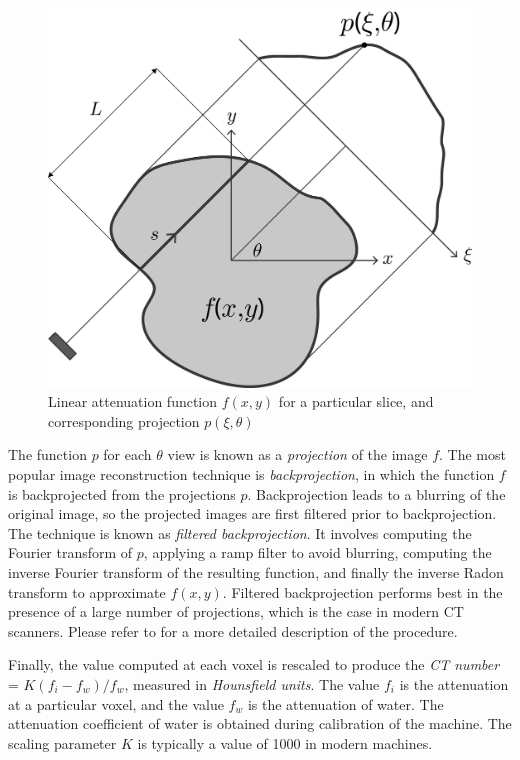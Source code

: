 \begin{figure}[ht]
\centering
		\includegraphics[scale=0.3]{media/0-imaging/ct3.png}
%
\caption{Linear attenuation function $f(x,y)$ for a particular slice, and corresponding projection $p(\xi,\theta)$}
\label{fig:ct3}
\end{figure}

The function $p$ for each $\theta$ view is known as a \textit{projection} of the image $f$. The most popular image reconstruction technique is \textit{backprojection}, in which the function $f$ is backprojected from the projections $p$. Backprojection leads to a blurring of the original image, so the projected images are first filtered prior to backprojection. The technique is known as \textit{filtered backprojection}. It involves computing the Fourier transform of $p$, applying a ramp filter to avoid blurring, computing the inverse Fourier transform of the resulting function, and finally the inverse Radon transform to approximate $f(x,y)$. Filtered backprojection performs best in the presence of a large number of projections, which is the case in modern CT scanners. Please refer to \cite{chetih_2015} for a more detailed description of the procedure.

Finally, the value computed at each voxel is rescaled to produce the \textit{CT number} = $K (f_i - f_w)/f_w$, measured in \textit{Hounsfield units}. The value $f_i$ is the attenuation at a particular voxel, and the value $f_w$ is the attenuation of water. The attenuation coefficient of water is obtained during calibration of the machine. The scaling parameter $K$ is typically a value of 1000 in modern machines.

